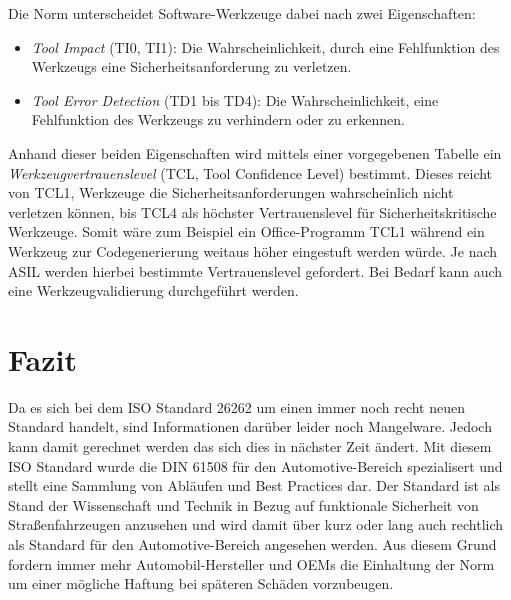 \documentclass[a4paper,DIV=calc,ngerman]{scrartcl}
\begin{document}
Die Norm unterscheidet Software-Werkzeuge dabei nach zwei Eigenschaften:
\begin{itemize}
    \item \emph{Tool Impact} (TI0, TI1): Die Wahrscheinlichkeit, durch eine Fehlfunktion des Werkzeugs eine Sicherheitsanforderung zu verletzen.
    \item \emph{Tool Error Detection} (TD1 bis TD4): Die Wahrscheinlichkeit, eine Fehlfunktion des Werkzeugs zu verhindern oder zu erkennen.
\end{itemize}
Anhand dieser beiden Eigenschaften wird mittels einer vorgegebenen Tabelle ein \emph{Werkzeugvertrauenslevel} (TCL, Tool Confidence Level) bestimmt. Dieses reicht von TCL1, Werkzeuge die Sicherheitsanforderungen wahrscheinlich nicht verletzen können, bis TCL4 als höchster Vertrauenslevel für Sicherheitskritische Werkzeuge. Somit wäre zum Beispiel ein Office-Programm TCL1 während ein Werkzeug zur Codegenerierung weitaus höher eingestuft werden würde. Je nach ASIL werden hierbei bestimmte Vertrauenslevel gefordert. Bei Bedarf kann auch eine Werkzeugvalidierung durchgeführt werden.





\section{Fazit}
\label{sec:Fazit}
Da es sich bei dem ISO Standard 26262 um einen immer noch recht neuen Standard handelt, sind Informationen darüber leider noch Mangelware. Jedoch kann damit gerechnet werden das sich dies in nächster Zeit ändert. Mit diesem ISO Standard wurde die DIN 61508 für den Automotive-Bereich spezialisert und stellt eine Sammlung von Abläufen und Best Practices dar. Der Standard ist als Stand der Wissenschaft und Technik in Bezug auf funktionale Sicherheit von Straßenfahrzeugen anzusehen und wird damit über kurz oder lang auch rechtlich als Standard für den Automotive-Bereich angesehen werden. Aus diesem Grund fordern immer mehr Automobil-Hersteller und OEMs die Einhaltung der Norm um einer mögliche Haftung bei späteren Schäden vorzubeugen.
\end{document}
